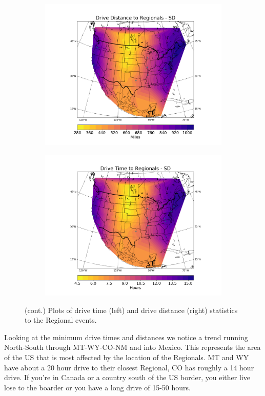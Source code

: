 \documentclass[11pt,twocolumn]{article}
\begin{document}
\begin{figure}
\begin{subfigure}{.5\textwidth}
  \includegraphics[height=.3\textheight]{../figs/Figure_11}
\end{subfigure}
\begin{subfigure}{.5\textwidth}
  \includegraphics[height=.3\textheight]{../figs/Figure_12}
\end{subfigure}
  \caption{(cont.) Plots of drive time (left) and drive distance (right) statistics to the Regional events.}
\label{fig:fig}
\end{figure}

Looking at the minimum drive times and distances we notice a trend running North-South through MT-WY-CO-NM and into Mexico. This represents the area of the US that is most affected by the location of the Regionals. MT and WY have about a 20 hour drive to their closest Regional, CO has roughly a 14 hour drive. If you're in Canada or a country south of the US border, you either live lose to the boarder or you have a long drive of 15-50 hours. 
\end{document}
